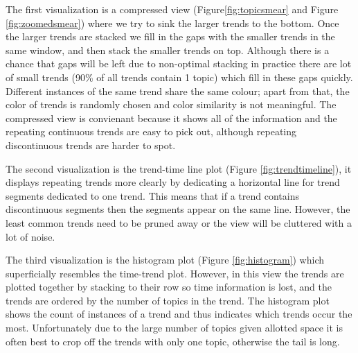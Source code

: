 \documentclass[times, 10pt,twocolumn]{article}
\begin{document}
The first visualization is a compressed view
(Figure\ref{fig:topicsmear} and Figure \ref{fig:zoomedsmear}) where we
try to sink the larger trends to the bottom.  Once the larger trends
are stacked we fill in the gaps with the smaller trends in the same
window, and then stack the smaller trends on top.  Although there is a
chance that gaps will be left due to non-optimal stacking in practice
there are lot of small trends (90\% of all trends contain 1 topic)
which fill in these gaps quickly.  Different instances of the same
trend share the same colour; apart from that, the color of trends is
randomly chosen and color similarity is not meaningful.
The compressed view is convienant because it shows all of the
information and the repeating continuous trends are easy to pick out,
although repeating discontinuous trends are harder to spot.

The second visualization is the trend-time line plot (Figure
\ref{fig:trendtimeline}), it displays repeating trends more clearly by
dedicating a horizontal line for trend segments dedicated to one
trend. This means that if a trend contains discontinuous segments then the
segments appear on the same line. 
However, the least common trends need to be pruned away or the view will be cluttered with a lot of noise.

The third visualization is the histogram plot (Figure
\ref{fig:histogram}) which superficially resembles the time-trend
plot.  However, in this view the trends are plotted together by
stacking to their row so time information is lost, and the trends are
ordered by the number of topics in the trend.  The histogram plot
shows the count of instances of a trend and thus indicates which
trends occur the most. Unfortunately due to the large number of topics
given allotted space it is often best to crop off the trends with only
one topic, otherwise the tail is long.
\end{document}
